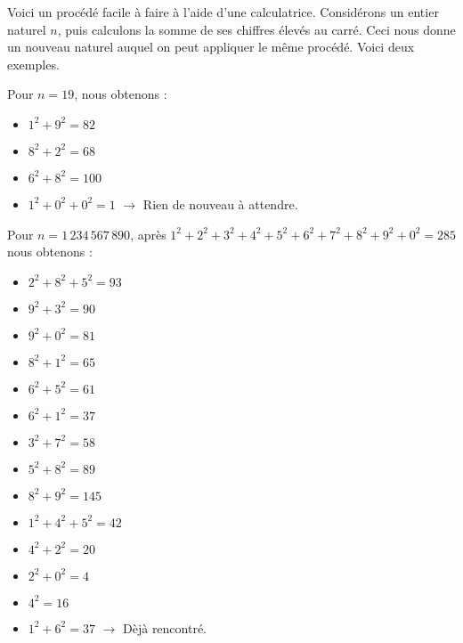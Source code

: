 Voici un procédé facile à faire à l'aide d'une calculatrice.
Considérons un entier naturel $n$, puis calculons la somme de ses chiffres élevés au carré. Ceci nous donne un nouveau naturel auquel on peut appliquer le même procédé. Voici deux exemples.


\begin{example}
	Pour $n = 19$, nous obtenons :
	\begin{itemize}[label=\textbullet]
		\item $1^2 + 9^2 = 82$
		\item $8^2 + 2^2 = 68$
		\item $6^2 + 8^2 = 100$
		\item $1^2 + 0^2 + 0^2 = 1$ $\rightarrow$ Rien de nouveau à attendre.
	\end{itemize}
\end{example}


\begin{example}
	Pour $n = 1\,234\,567\,890$, après $1^2 + 2^2 + 3^2 + 4^2 + 5^2 + 6^2 + 7^2 + 8^2 + 9^2 + 0^2 = 285$ nous obtenons :
	\vspace{-.7em}
	\begin{multicols}{2}
		\begin{itemize}[label=\textbullet]
			\item $2^2 + 8^2 + 5^2 = 93$
			\item $9^2 + 3^2 = 90$
			\item $9^2 + 0^2 = 81$
			\item $8^2 + 1^2 = 65$
			\item $6^2 + 5^2 = 61$
			\item $6^2 + 1^2 = 37$
			\item $3^2 + 7^2 = 58$
		\end{itemize}
		\columnbreak
		\begin{itemize}[label=\textbullet]
			\item $5^2 + 8^2 = 89$
			\item $8^2 + 9^2 = 145$
			\item $1^2 + 4^2 + 5^2 = 42$
			\item $4^2 + 2^2 = 20$
			\item $2^2 + 0^2 = 4$
			\item $4^2 = 16$ 
			\item $1^2 + 6^2 = 37$ $\rightarrow$ Dèjà rencontré.
		\end{itemize}
	\end{multicols}
\end{example}


